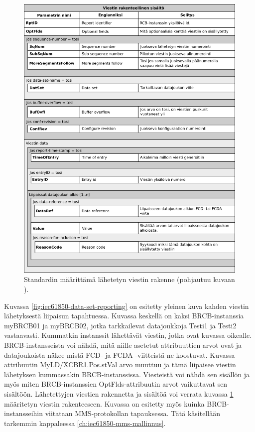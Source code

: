 \begin{figure}[ht!]
	\includegraphics[width=1\textwidth]{pictures/iec61850-report-format.png}
	\caption{Standardin määrittämä lähetetyn viestin rakenne (pohjautuu kuvaan \mbox{\cite[s.~104]{IEC61850-7-2}}).}
	\label{fig:iec61850-report-format}
\end{figure}

Kuvassa \ref{fig:iec61850-data-set-reporting} on esitetty yleinen kuva kahden viestin lähetyksestä liipaisun tapahtuessa. Kuvassa keskellä on kaksi BRCB-instanssia myBRCB01 ja myBRCB02, jotka tarkkailevat datajoukkoja Testi1 ja Testi2 vastaavasti. Kummatkin instanssit lähettävät viestin, jotka ovat kuvassa oikealle. BRCB-instansseista voi nähdä, mitä niille asetetut attribuuttien arvot ovat ja datajoukoista näkee mistä FCD- ja FCDA -viitteistä ne koostuvat. Kuvassa attribuutin MyLD/XCBR1.Pos.stVal arvo muuttuu ja tämä liipaisee viestin lähetyksen kummassakin BRCB-instanssissa. Viesteistä voi nähdä sen sisällön ja myös miten BRCB-instanssien OptFlds-attribuutin arvot vaikuttavat sen sisältöön. Lähetettyjen viestien rakennetta ja sisältöä voi verrata kuvassa \ref{fig:iec61850-report-format} määritetyn viestin rakenteeseen. Kuvassa on esitetty myös kuinka BRCB-instansseihin viitataan MMS-protokollan tapauksessa. Tätä käsitellään tarkemmin kappaleessa \ref{ch:iec61850-mms-mallinnus}.

